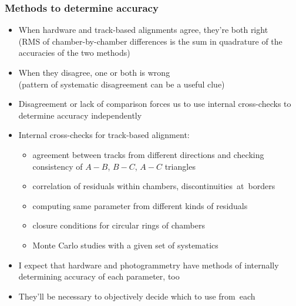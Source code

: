 \documentclass[compress]{beamer}
\begin{document}
\begin{frame}
\frametitle{Methods to determine accuracy}
\begin{itemize}
\item When hardware and track-based alignments agree, they're both right \\
(RMS of chamber-by-chamber differences is the sum in quadrature of the accuracies of the two methods)
\item When they disagree, one or both is wrong \\
(pattern of systematic disagreement can be a useful clue)
\item Disagreement or lack of comparison forces us to use internal
  cross-checks to determine accuracy independently
\item Internal cross-checks for track-based alignment:
\begin{itemize}
\item agreement between tracks from different directions and checking consistency of $A-B$, $B-C$, $A-C$ triangles %
\item correlation of residuals within chambers, \mbox{discontinuities at borders\hspace{-1 cm}}
\item computing same parameter from different kinds of residuals %
\item closure conditions for circular rings of chambers
\item Monte Carlo studies with a given set of systematics
\end{itemize}
\item I expect that hardware and photogrammetry have methods of
  internally determining accuracy of each parameter, too
\item They'll be necessary to objectively decide which to use \mbox{from each\hspace{-1 cm}}
\end{itemize}
\end{frame}


\end{document}
